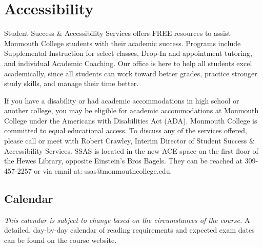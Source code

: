 \documentclass[10pt]{article}
\begin{document}
\section{Accessibility}

Student Success \& Accessibility Services offers FREE resources to assist Monmouth College students with their academic success. Programs include Supplemental Instruction for select classes, Drop-In and appointment tutoring, and individual Academic Coaching. Our office is here to help all students excel academically, since all students can work toward better grades, practice stronger study skills, and manage their time better.

If you have a disability or had academic accommodations in high school or another college, you may be eligible for academic accommodations at Monmouth College under the Americans with Disabilities Act (ADA). Monmouth College is committed to equal educational access. To discuss any of the services offered, please call or meet with Robert Crawley, Interim Director of Student Success \& Accessibility Services.  SSAS is located in the new ACE space on the first floor of the Hewes Library, opposite Einstein’s Bros Bagels. They can be reached at 309-457-2257 or via email at: ssas@monmouthcollege.edu.



\subsection{Calendar}

\textit{This calendar is subject to change based on the circumstances of the course.} A detailed, day-by-day calendar of reading requirements and expected exam dates can be found on the course website.
\end{document}
